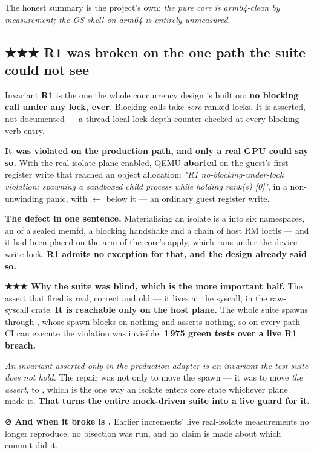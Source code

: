 \documentclass[10.5pt]{article}
\begin{document}
The honest summary is the project's own: \emph{the pure core is arm64-clean by measurement; the OS
shell on arm64 is entirely unmeasured}.

\subsection{\texorpdfstring{★★★ R1 was broken on the one path the suite could not see}{R1 was broken on the one path the suite could not see}}
\label{sec:r1}

Invariant \textbf{R1} is the one the whole concurrency design is built on: \textbf{no blocking
call under any lock, ever}. Blocking calls take \emph{zero} ranked locks. It is asserted, not
documented — a thread-local lock-depth counter checked at every blocking-verb entry.

\textbf{It was violated on the production path, and only a real GPU could say so.} With the real
isolate plane enabled, QEMU \textbf{aborted} on the guest's first register write that reached an
object allocation: \emph{"R1 no-blocking-under-lock violation: spawning a sandboxed child process
while holding rank(s) [0]"}, in a non-unwinding panic, with 
$\leftarrow$  below it — an ordinary guest register write.

\textbf{The defect in one sentence.} Materialising an isolate is a  into six
namespaces, an  of a sealed memfd, a blocking handshake and a chain of host RM
ioctls — and it had been placed on the  arm of the core's apply, which runs under the
device write lock. \textbf{R1 admits no exception for that, and the design already said so.}

\begin{warnbox}\small
\textbf{★★★ Why the suite was blind, which is the more important half.} The assert that fired is
real, correct and old — it lives at the syscall, in the raw-syscall crate. \textbf{It is
reachable only on the host plane.} The whole suite spawns through ,
whose spawn blocks on nothing and asserts nothing, so on every path CI can execute the violation
was invisible: \textbf{1\,975 green tests over a live R1 breach.}

\smallskip
\emph{An invariant asserted only in the production adapter is an invariant the test suite does not
hold.} The repair was not only to move the spawn — it was to move \emph{the assert}, to
, which is the one way an isolate enters core state whichever plane made
it. \textbf{That turns the entire mock-driven suite into a live guard for it.}

\smallskip
⊘ \textbf{And when it broke is \unver{}.} Earlier increments' live real-isolate measurements no
longer reproduce, no bisection was run, and no claim is made about which commit did it.
\end{warnbox}
\end{document}
